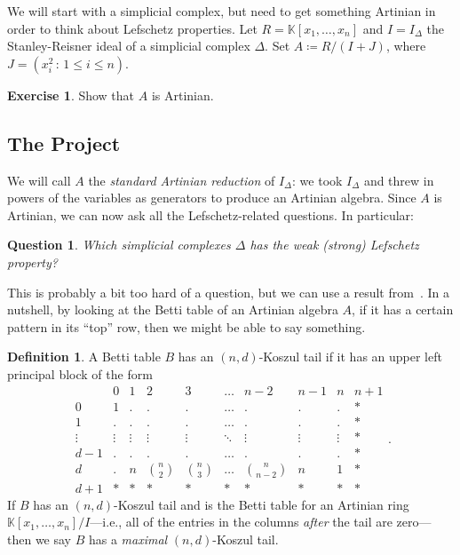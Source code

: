 \documentclass[12pt,a4paper]{article}
\newcommand{\KK}{\mathbb{K}}
\newtheorem{question}[theorem]{Question}
\theoremstyle{definition}
\newtheorem{definition}[theorem]{Definition}
\newtheorem{exercise}[theorem]{Exercise}
\numberwithin{equation}{section}
\begin{document}
\newpage
We will start with a simplicial complex, but need to get something Artinian in order to think about Lefschetz properties.
Let $R = \KK[x_1,\dots,x_n]$ and $I = I_\Delta$ the Stanley-Reisner ideal of a simplicial complex $\Delta$. 
Set $A \coloneqq R/(I+J)$, where $J = (x_i^2 \, \colon \, 1 \leq i \leq n)$.

\begin{exercise}
    Show that $A$ is Artinian.
\end{exercise}


\subsection{The Project}
We will call $A$ the \emph{standard Artinian reduction} of $I_\Delta$: we took $I_\Delta$ and threw in powers of the variables as generators to produce an Artinian algebra.
Since $A$ is Artinian, we can now ask all the Lefschetz-related questions.
In particular:

\begin{question}
    \label{question:simplicial complexes lefschetz}
    Which simplicial complexes $\Delta$ has the weak (strong) Lefschetz property?
\end{question}

This is probably a bit too hard of a question, but we can use a result from~\cite{grate_betti_2024}.
In a nutshell, by looking at the Betti table of an Artinian algebra $A$, if it has a certain pattern in its ``top'' row, then we might be able to say something.

\begin{definition}{\cite[Definition~1]{grate_betti_2024}}
    A Betti table $B$ has an $(n,d)$-Koszul tail if it has an upper left principal block of the form
    \begin{equation*}
        \begin{array}{r|ccccccccc}
              & 0 & 1 & 2 & 3 & \dots & n-2 & n-1 & n & n+1 \\
            \hline
            0 & 1 & . & . & . & \dots & . & . & . & * \\
            1 & . & . & . & . & \dots & . & . & . & * \\
            \vdots & \vdots & \vdots & \vdots & \vdots & \ddots & \vdots & \vdots & \vdots & * \\
            d-1 & . & . & . & . & \dots & . & . & . & * \\
            d & . & n & \binom{n}{2} & \binom{n}{3} & \dots & \binom{n}{n-2} & n & 1 & * \\
            d+1 & * & * & * & * & * & * & * & * & *
        \end{array}.
    \end{equation*}
    If $B$ has an $(n,d)$-Koszul tail and is the Betti table for an Artinian ring $\KK[x_1,\dots,x_n]/I$---i.e., all of the entries in the columns \emph{after} the tail are zero---then we say $B$ has a \emph{maximal} $(n,d)$-Koszul tail.
\end{definition}
\end{document}
